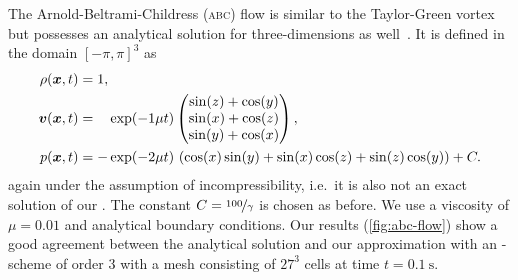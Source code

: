 \documentclass[runningheads]{llncs}
\begin{document}
The Arnold-Beltrami-Childress (\textsc{abc}) flow is similar to the Taylor-Green vortex but possesses an analytical solution for three-dimensions as well~\cite{tavelli2016staggered}.
It is defined in the domain \( \left[ -\pi, \pi \right]^3 \) as
\begin{align}
  \label{eq:abc-flow}
  \begin{split}
  \rho(\bm{x}, t) &= 1,\\
  \bm{v}(\bm{x}, t) &= \phantom{-} \exp(-1\mu t)
  \begin{pmatrix}
    \sin(z) + \cos(y)\\
    \sin(x) + \cos(z)\\
    \sin(y) + \cos(x)
  \end{pmatrix}, \\
  p(\bm{x}, t) &= -\exp(-2 \mu t) \, \left(\cos(x)\sin(y) + \sin(x)\cos(z) + \sin(z)\cos(y)\right)
  + C.
  \end{split}
\end{align}
again under the assumption of incompressibility, i.e.\ it is also not an exact solution of our \pde{}.
The constant $C = \nicefrac{100}{\gamma}$ is chosen as before.
We use a viscosity of $\mu = 0.01$ and analytical boundary conditions.
Our results (\cref{fig:abc-flow}) show a good agreement between the analytical solution and our approximation with an \aderdg{}-scheme of order $3$ with a mesh consisting of $27^3$ cells at time $t = \SI{0.1}{\s}$.
\end{document}
